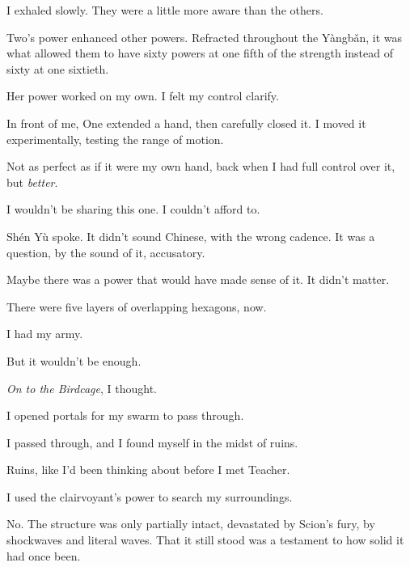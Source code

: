 I exhaled slowly.  They were a little more aware than the others.



Two's power enhanced other powers.  Refracted throughout the Y\`{a}ngb\v{a}n, it was what allowed them to have sixty powers at one fifth of the strength instead of sixty at one sixtieth.



Her power worked on my own.  I felt my control clarify.



In front of me, One extended a hand, then carefully closed it.  I moved it experimentally, testing the range of motion.



Not as perfect as if it were my own hand, back when I had full control over it, but \emph{better}.



I wouldn't be sharing this one.  I couldn't afford to.



Sh\'{e}n Y\`{u} spoke.  It didn't sound Chinese, with the wrong cadence.  It was a question, by the sound of it, accusatory.



Maybe there was a power that would have made sense of it.  It didn't matter.



There were five layers of overlapping hexagons, now.



I had my army.



But it wouldn't be enough.



\emph{On to the Birdcage}, I thought.



I opened portals for my swarm to pass through.



I passed through, and I found myself in the midst of ruins.



Ruins, like I'd been thinking about before I met Teacher.



I used the clairvoyant's power to search my surroundings.



No.  The structure was only partially intact, devastated by Scion's fury, by shockwaves and literal waves.  That it still stood was a testament to how solid it had once been.



